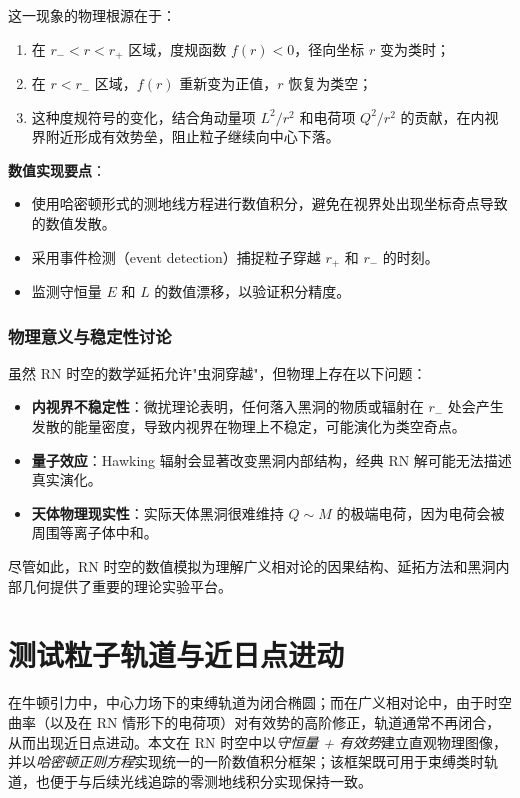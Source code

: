 \documentclass[a4paper,12pt]{article}
\begin{document}
这一现象的物理根源在于：
\begin{enumerate}
\item 在 $r_- < r < r_+$ 区域，度规函数 $f(r) < 0$，径向坐标 $r$ 变为类时；
\item 在 $r < r_-$ 区域，$f(r)$ 重新变为正值，$r$ 恢复为类空；
\item 这种度规符号的变化，结合角动量项 $L^2/r^2$ 和电荷项 $Q^2/r^2$ 的贡献，在内视界附近形成有效势垒，阻止粒子继续向中心下落。
\end{enumerate}

\textbf{数值实现要点}：
\begin{itemize}
\item 使用哈密顿形式的测地线方程进行数值积分，避免在视界处出现坐标奇点导致的数值发散。
\item 采用事件检测（event detection）捕捉粒子穿越 $r_+$ 和 $r_-$ 的时刻。
\item 监测守恒量 $E$ 和 $L$ 的数值漂移，以验证积分精度。
\end{itemize}

\subsubsection{物理意义与稳定性讨论}

虽然 RN 时空的数学延拓允许"虫洞穿越"，但物理上存在以下问题：

\begin{itemize}
\item \textbf{内视界不稳定性}：微扰理论表明，任何落入黑洞的物质或辐射在 $r_-$ 处会产生发散的能量密度，导致内视界在物理上不稳定，可能演化为类空奇点。
\item \textbf{量子效应}：Hawking 辐射会显著改变黑洞内部结构，经典 RN 解可能无法描述真实演化。
\item \textbf{天体物理现实性}：实际天体黑洞很难维持 $Q \sim M$ 的极端电荷，因为电荷会被周围等离子体中和。
\end{itemize}

尽管如此，RN 时空的数值模拟为理解广义相对论的因果结构、延拓方法和黑洞内部几何提供了重要的理论实验平台。





\newpage

\section{测试粒子轨道与近日点进动}

在牛顿引力中，中心力场下的束缚轨道为闭合椭圆；而在广义相对论中，由于时空曲率（以及在 RN 情形下的电荷项）对有效势的高阶修正，轨道通常不再闭合，从而出现近日点进动。本文在 RN 时空中以\emph{守恒量 + 有效势}建立直观物理图像，并以\emph{哈密顿正则方程}实现统一的一阶数值积分框架；该框架既可用于束缚类时轨道，也便于与后续光线追踪的零测地线积分实现保持一致。
\end{document}
